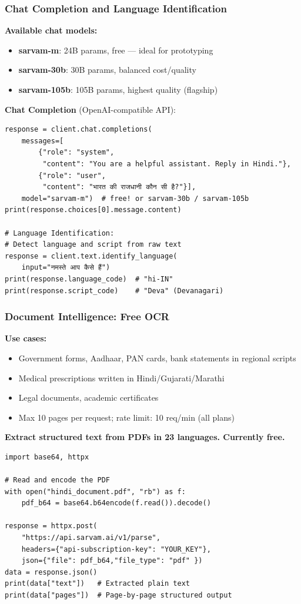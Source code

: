\begin{frame}[fragile]\frametitle{Chat Completion and Language Identification}
\textbf{Available chat models:}
\begin{itemize}
  \item \textbf{sarvam-m}: 24B params, free --- ideal for prototyping
  \item \textbf{sarvam-30b}: 30B params, balanced cost/quality
  \item \textbf{sarvam-105b}: 105B params, highest quality (flagship)
\end{itemize}

\textbf{Chat Completion} (OpenAI-compatible API):
\begin{lstlisting}
response = client.chat.completions(
    messages=[
        {"role": "system",
         "content": "You are a helpful assistant. Reply in Hindi."},
        {"role": "user",
         "content": "भारत की राजधानी कौन सी है?"}],
    model="sarvam-m")  # free! or sarvam-30b / sarvam-105b
print(response.choices[0].message.content)

# Language Identification:
# Detect language and script from raw text
response = client.text.identify_language(
    input="नमस्ते आप कैसे हैं")
print(response.language_code)  # "hi-IN"
print(response.script_code)    # "Deva" (Devanagari)
\end{lstlisting}

\end{frame}

\begin{frame}[fragile]\frametitle{Document Intelligence: Free OCR}

\textbf{Use cases:}
  \begin{itemize}
    \item Government forms, Aadhaar, PAN cards, bank statements in regional scripts
    \item Medical prescriptions written in Hindi/Gujarati/Marathi
    \item Legal documents, academic certificates
    \item Max 10 pages per request; rate limit: 10 req/min (all plans)
  \end{itemize}
  
\textbf{Extract structured text from PDFs in 23 languages. Currently free.}
\begin{lstlisting}
import base64, httpx

# Read and encode the PDF
with open("hindi_document.pdf", "rb") as f:
    pdf_b64 = base64.b64encode(f.read()).decode()

response = httpx.post(
    "https://api.sarvam.ai/v1/parse",
    headers={"api-subscription-key": "YOUR_KEY"},
    json={"file": pdf_b64,"file_type": "pdf" })
data = response.json()
print(data["text"])   # Extracted plain text
print(data["pages"])  # Page-by-page structured output
\end{lstlisting}


\end{frame}


